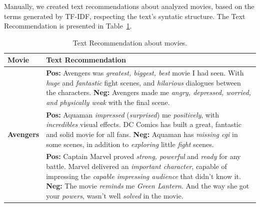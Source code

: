 



Manually, we created text recommendations about analyzed movies, based on the terms generated by TF-IDF, respecting the text's syntatic structure. The Text Recommendation is presented in Table~\ref{ref:text-rec}.  

\begin{table}[h!]    
    \small
    \begin{tabular}{  l | p{6cm} }
    \hline
        \textbf{Movie} & \textbf{Text Recommendation} \\ 
    \hline
        \multirow{6}{*}{\textbf{Avengers}} & \textbf{Pos:} Avengers was \textit{greatest, biggest, best} movie I had seen. With \textit{huge} and \textit{fantastic} fight scenes, and \textit{hilarious} dialogues between the characters. \textbf{Neg:} Avengers made me \textit{angry, depressed, worried, and physically weak} with the final scene. \\ 
    \hline
        \multirow{6}{*}{\textbf{Aquaman}} & \textbf{Pos:} Aquaman \textit{impressed} (\textit{surprised}) me \textit{positively}, with \textit{incredibles} visual effects. DC Comics has built a great, fantastic and solid movie for all fans. \textbf{Neg:} Aquaman has \textit{missing cgi} in some scenes, in addition to \textit{exploring} little \textit{fight} scenes. \\ 
    \hline
        \multirow{8}{*}{\textbf{Captain M.}} & \textbf{Pos:} Captain Marvel proved \textit{strong, powerful} and \textit{ready} for any battle. Marvel delivered an \textit{important character}, capable of impressing the \textit{capable impressing audience} that didn't know it. \textbf{Neg:} The movie \textit{reminds} me \textit{Green Lantern}. And the way she got your \textit{powers}, wasn't well \textit{solved} in the movie.\\
    \hline
    \end{tabular}
    \caption{Text Recommendation about movies.}
    \label{ref:text-rec}
\end{table}

